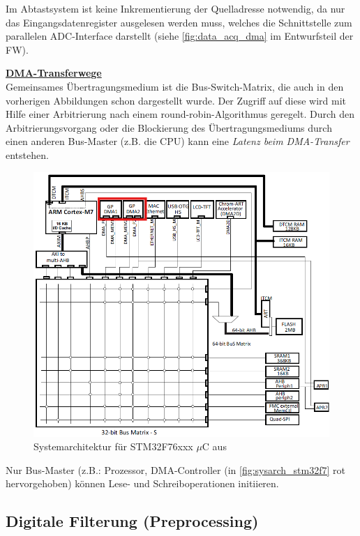 \documentclass[a4paper, portrait, 12pt]{scrartcl} %
\begin{document}
Im Abtastsystem ist keine Inkrementierung der Quelladresse notwendig, da nur das Eingangsdatenregister ausgelesen werden muss, welches die Schnittstelle zum parallelen ADC-Interface darstellt (siehe \autoref{fig:data_acq_dma} im Entwurfsteil der FW).

\pagebreak

\textbf{\underline{DMA-Transferwege}}\\

Gemeinsames Übertragungsmedium ist die Bus-Switch-Matrix, die auch in den vorherigen Abbildungen schon dargestellt wurde. Der Zugriff auf diese wird mit Hilfe einer Arbitrierung nach einem round-robin-Algorithmus geregelt. 
Durch den Arbitrierungsvorgang oder die Blockierung des Übertragungsmediums durch einen anderen Bus-Master (z.B. die CPU) kann eine \emph{Latenz beim DMA-Transfer} entstehen.

\begin{figure}[H]
	\centering
    \includegraphics[scale=0.7]{Systemarchitektur_STM32F7.png} 
	\caption{Systemarchitektur für STM32F76xxx $\mu$C aus \cite[S. 72]{STmicroelectronics2024}}
	\label{fig:sysarch_stm32f7}
\end{figure}

Nur Bus-Master (z.B.: Prozessor, DMA-Controller (in \autoref{fig:sysarch_stm32f7} rot hervorgehoben) können Lese- und Schreiboperationen initiieren.

\pagebreak

\subsection{Digitale Filterung (Preprocessing)}
\label{subsec:digital_filtering}
\end{document}
